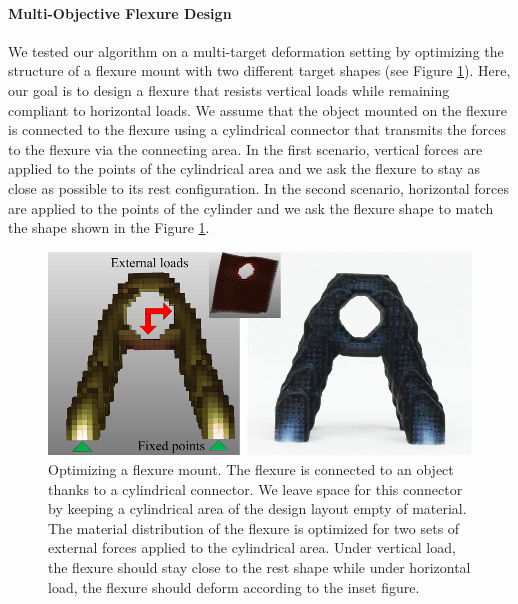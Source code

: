 		\paragraph{Multi-Objective Flexure Design}
		We tested our algorithm on a multi-target deformation setting by optimizing the structure of a flexure mount with two different target shapes (see Figure \ref{fig:flexure}). Here, our goal is to design a flexure that resists vertical loads while remaining compliant to horizontal loads. We assume that the object mounted on the flexure is connected to the flexure using a cylindrical connector that transmits the forces to the flexure via the connecting area. In the first scenario, vertical forces are applied to the points of the cylindrical area and we ask the flexure to stay as close as possible to its rest configuration. In the second scenario, horizontal forces are applied to the points of the cylinder and we ask the flexure shape to match the shape shown in the Figure \ref{fig:flexure}. 
		\begin{figure}
			\centering
			\includegraphics[width=.6\linewidth]{images/flex_four.png}	
			\caption{Optimizing a flexure mount. The flexure is connected to an object thanks to a cylindrical connector. We leave space for this connector by keeping a cylindrical area of the design layout empty of material. The material distribution of the flexure is optimized for two sets of external forces applied to the cylindrical area. Under vertical load, the flexure should stay close to the rest shape while under horizontal load, the flexure should deform according to the inset figure.}
				\label{fig:flexure}
		\end{figure}
